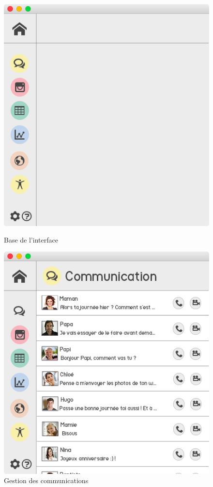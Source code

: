 \documentclass[11pt]{article}
\begin{document}
\begin{figure}[hbtp]
    \begin{minipage}[b]{0.4\linewidth}
        \centering \includegraphics[scale=0.43]{Modelisation/base.png}
        \caption{Base de l'interface}
\label{fig:base}
    \end{minipage}\hfill
    \begin{minipage}[b]{0.48\linewidth}
        \centering \includegraphics[scale=0.43]{Modelisation/communication.png}
        \caption{Gestion des communications}
        \label{fig:communication}
    \end{minipage}
\end{figure}
\end{document}
